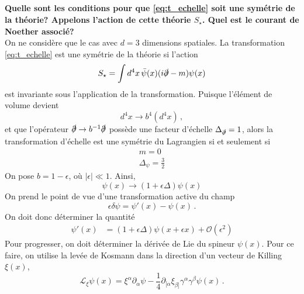 \documentclass{article}
\numberwithin{equation}{section}
\theoremstyle{solution}
\begin{document}
\subsection{}
\textbf{Quelle sont les conditions pour que \eqref{eq:t_echelle} soit une symétrie de la théorie? Appelons l’action
de cette théorie $S_{\star}$. Quel est le courant de Noether associé?} \\
On ne considère que le cas avec $d = 3$ dimensions spatiales.
La transformation \eqref{eq:t_echelle} est une symétrie de la théorie si l'action 
\begin{equation}\label{eq:action}
        S_\star = \int d^{4}x\, \bar{\psi}(x)(i \slashed{\partial} - m)\psi(x)
\end{equation} 
est invariante sous l'application de la transformation. Puisque l'élément de volume devient
\begin{equation}
        d^{4}x \rightarrow b^{4}(d^{4}x)\, ,
\end{equation} 
et que l'opérateur $\slashed{\partial} \rightarrow b^{-1} \slashed{\partial}$ possède une facteur d'échelle $\Delta_{\slashed{\partial}} = 1$, alors 
la transformation d'échelle est une symétrie du Lagrangien si et seulement si
\begin{equation}
        \boxed{
        \begin{split}
              m = 0 \\
              \Delta_\psi = \frac{3}{2}
        \end{split}
}
\end{equation} 
On pose $b = 1 - \epsilon$, où $|\epsilon| \ll 1$. Ainsi, 
\begin{equation}
        \psi(x) \rightarrow  (1 + \epsilon\Delta ) \psi(x)
\end{equation} 
On prend le point de vue d'une transformation active du champ
\begin{equation}
     \epsilon   \delta \psi = \psi'(x) - \psi(x) \, .
\end{equation} 
On doit donc déterminer la quantité
\begin{align*}
        \psi'(x) &=  (1 + \epsilon\Delta ) \psi(x + \epsilon x) + \mathcal{O}(\epsilon^{2})
\end{align*}
Pour progresser, on doit déterminer la dérivée de Lie du spineur $\psi(x)$. Pour ce faire, on utilise la levée de Kosmann dans 
la direction d'un vecteur de Killing $\xi(x)$, 
\begin{equation}
        \mathcal{L}_{\xi} \psi(x) = \xi^{\alpha}\partial_\alpha \psi - \frac{1}{4}\partial_{[\alpha}\xi_{\beta]} \gamma^{\alpha}\gamma^{\beta} \psi(x) \, .
\end{equation} 
\end{document}
